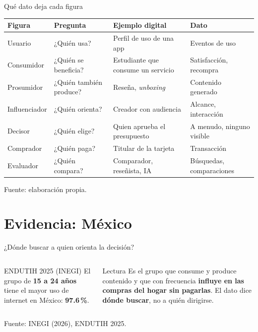 \documentclass[aspectratio=169,xcolor=dvipsnames]{beamer}
\newcommand{\fuente}[1]{{\tiny\color{IPNgris}Fuente: #1}}
\begin{document}
\begin{frame}{Qué dato deja cada figura}
\scriptsize
\begin{center}
\begin{tabular}{@{}>{\raggedright}p{2.0cm}>{\raggedright}p{3.2cm}>{\raggedright}p{3.2cm}>{\raggedright\arraybackslash}p{2.5cm}@{}}
\toprule
\textbf{Figura} & \textbf{Pregunta} & \textbf{Ejemplo digital} & \textbf{Dato} \\
\midrule
Usuario & ¿Quién usa? & Perfil de uso de una app & Eventos de uso \\
Consumidor & ¿Quién se beneficia? & Estudiante que consume un servicio & Satisfacción, recompra \\
Prosumidor & ¿Quién también produce? & Reseña, \textit{unboxing} & Contenido generado \\
Influenciador & ¿Quién orienta? & Creador con audiencia & Alcance, interacción \\
Decisor & ¿Quién elige? & Quien aprueba el presupuesto & A menudo, ninguno visible \\
Comprador & ¿Quién paga? & Titular de la tarjeta & Transacción \\
Evaluador & ¿Quién compara? & Comparador, reseñista, IA & Búsquedas, comparaciones \\
\bottomrule
\end{tabular}
\end{center}
\fuente{elaboración propia.}
\end{frame}

\section[Evidencia]{Evidencia: México}

\begin{frame}{¿Dónde buscar a quien orienta la decisión?}
\begin{columns}[T]
  \begin{block}{ENDUTIH 2025 (INEGI)}
    \small El grupo de \textbf{15 a 24 años} tiene el mayor uso de internet en México: \textbf{97.6\,\%}.
  \end{block}
  \begin{alertblock}{Lectura}
    \small Es el grupo que consume y produce contenido y que con frecuencia \textbf{influye en las compras del hogar sin pagarlas}. El dato dice \textbf{dónde buscar}, no a quién dirigirse.
  \end{alertblock}
\end{columns}
\fuente{INEGI (2026), ENDUTIH 2025.}
\end{frame}
\end{document}
